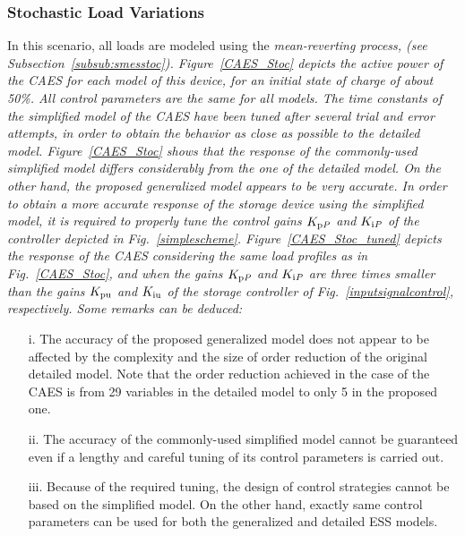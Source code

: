 \documentclass[journal, a4paper]{IEEEtran}
\begin{document}
\subsubsection{Stochastic Load Variations}
\label{subsub:caesstoc}
In this scenario, all loads are modeled using the \it mean-reverting \rm process,
(see Subsection~\ref{subsub:smesstoc}). Figure~\ref{CAES_Stoc}
depicts the active power of the CAES for each model of this device, for an initial state 
of charge of about 50\%. All control parameters are the same for all models. 
The time constants of the simplified model of the CAES have been tuned after several
trial and error attempts, in order to obtain the behavior as close as possible to 
the detailed model. Figure~\ref{CAES_Stoc} shows that the response of the
commonly-used simplified model differs considerably from the one of the detailed model.
On the other hand, the proposed generalized model appears to be very accurate.
In order to obtain a more accurate response of the storage device using
the simplified model, it is required to properly tune the control gains $K_{\rm p \it P}$ 
and $K_{\rm i \it P}$ of the controller depicted in Fig.~\ref{simplescheme}. 
Figure~\ref{CAES_Stoc_tuned} depicts the response of the CAES considering the same 
load profiles as in Fig.~\ref{CAES_Stoc}, and when the gains $K_{\rm p \it P}$ 
and $K_{\rm i \it P}$ are three times smaller than the gains $K_{\rm pu}$ and
$K_{\rm iu}$ of the storage controller of Fig.~\ref{inputsignalcontrol}, respectively.
Some remarks can be deduced:
\begin{itemize}
\item[i.]   The accuracy  of the  proposed generalized  model 
  does not appear to be affected by the complexity and the size of order 
  reduction of the original detailed model. Note that the order reduction
  achieved in the case of the CAES is from 29 variables in the detailed model
  to only 5 in the proposed one. 
\item[ii.] The  accuracy of the commonly-used  simplified model cannot
  be guaranteed even  if a lengthy and careful tuning  of its control
  parameters is carried out.
\item[iii.]  Because  of the  required tuning,  the design  of control
  strategies cannot  be based on  the simplified model.  On  the other
  hand,  exactly same  control parameters  can  be used  for both  the
  generalized and detailed  ESS models.  
\end{itemize}
\end{document}
